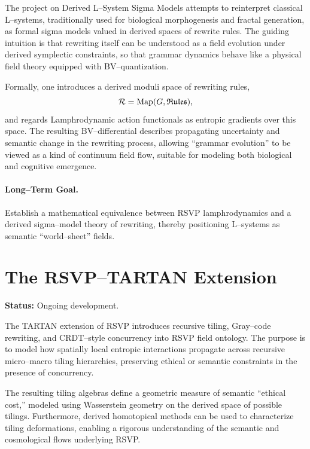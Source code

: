 \documentclass[12pt]{article}
\theoremstyle{plain}
\theoremstyle{definition}
\theoremstyle{remark}
\begin{document}
The project on Derived L--System Sigma Models attempts to reinterpret classical
L--systems, traditionally used for biological morphogenesis and fractal
generation, as formal sigma models valued in derived spaces of rewrite rules.
The guiding intuition is that rewriting itself can be understood as a field
evolution under derived symplectic constraints, so that grammar dynamics
behave like a physical field theory equipped with BV--quantization.

Formally, one introduces a derived moduli space of rewriting rules,
\[
    \mathcal{R} = {\rm Map}(G, \mathfrak{Rules}),
\]
and regards Lamphrodynamic action functionals as entropic gradients over this
space. The resulting BV--differential describes propagating uncertainty and
semantic change in the rewriting process, allowing ``grammar evolution'' to
be viewed as a kind of continuum field flow, suitable for modeling both
biological and cognitive emergence.

\paragraph{Long--Term Goal.}
Establish a mathematical equivalence between RSVP lamphrodynamics and a derived
sigma--model theory of rewriting, thereby positioning L--systems as semantic
``world--sheet'' fields.


\section{The RSVP--TARTAN Extension}

\textbf{Status:} Ongoing development.

\medskip

The TARTAN extension of RSVP introduces recursive tiling, Gray--code rewriting,
and CRDT--style concurrency into RSVP field ontology. The purpose is to model
how spatially local entropic interactions propagate across recursive
micro--macro tiling hierarchies, preserving ethical or semantic constraints in
the presence of concurrency. 

The resulting tiling algebras define a geometric measure of semantic
``ethical cost,'' modeled using Wasserstein geometry on the derived space of
possible tilings. Furthermore, derived homotopical methods can be used to
characterize tiling deformations, enabling a rigorous understanding of the
semantic and cosmological flows underlying RSVP.
\end{document}
